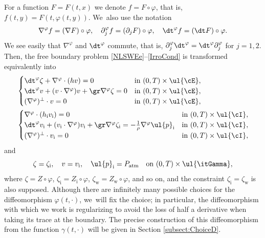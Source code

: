 For a function $F=F(t,x)$ we denote $f=F\circ\varphi$, that is, $f(t,y)=F(t,\varphi(t,y))$. We~also use the notation
\begin{equation}\label{DiffOP}
\nabla^\varphi f=(\nabla F)\circ\varphi, \quad \partial_j^\varphi f=(\partial_j F)\circ\varphi,
\quad \dt^\varphi f=(\dt F)\circ\varphi.
\end{equation}
We see easily that $\nabla^\varphi$ and $\dt^\varphi$ commute, that is, $\partial_j^\varphi \dt^\varphi = \dt^\varphi \partial_j^\varphi$ for $j=1,2$.
Then, the free boundary problem \eqref{NLSWEe}--\eqref{IrroCond} is transformed equivalently into
\begin{align}\label{nlswe}
&\begin{cases}
\dt^\varphi\zeta+\nabla^\varphi\cdot(hv) = 0 &\text{in } (0,T)\times\ul{\cE}, \\
\dt^\varphi v+(v\cdot\nabla^\varphi)v+\gr\nabla^\varphi \zeta = 0 &\text{in } (0,T)\times\ul{\cE}, \\
(\nabla^\varphi)^\perp\cdot v=0 &\text{in } (0,T)\times\ul{\cE},
\end{cases}
\\
\label{nlswi}
&\begin{cases}
\nabla^\varphi\cdot(h_\mathrm{i}v_\mathrm{i}) = 0 &\text{in } (0,T)\times\ul{\cI}, \\
\dt^\varphi v_\mathrm{i}+(v_\mathrm{i}\cdot\nabla^\varphi)v_\mathrm{i}+\gr\nabla^\varphi \zeta_\mathrm{i}
= -\frac{1}{\rho}\nabla^\varphi\ul{p}_\mathrm{i} &\text{in } (0,T)\times\ul{\cI}, \\
(\nabla^\varphi)^\perp\cdot v_\mathrm{i}=0 &\text{in } (0,T)\times\ul{\cI},
\end{cases}
\end{align}
and
\begin{equation}\label{mc}
\zeta=\zeta_\mathrm{i}, \quad v=v_\mathrm{i}, \quad \ul{p}_\mathrm{i}=P_\mathrm{atm} \quad\text{on } (0,T)\times\ul{\itGamma},
\end{equation}
where $\zeta=Z\circ\varphi$, $\zeta_\mathrm{i}=Z_\mathrm{i}\circ\varphi$, $\zeta_\mathrm{w}=Z_\mathrm{w}\circ\varphi$, and so on,
and the constraint $\zeta_\mathrm{i}=\zeta_\mathrm{w}$ is also supposed.
Although there are infinitely many possible choices for the diffeomorphism $\varphi(t,\cdot)$, we~will fix the choice;
in particular, the diffeomorphism with which we work is regularizing to avoid the loss of half a derivative when taking its trace at the boundary.
The precise construction of this diffeomorphism from the function $\gamma(t,\cdot)$ will be given in Section \ref{subsect:ChoiceD}.
